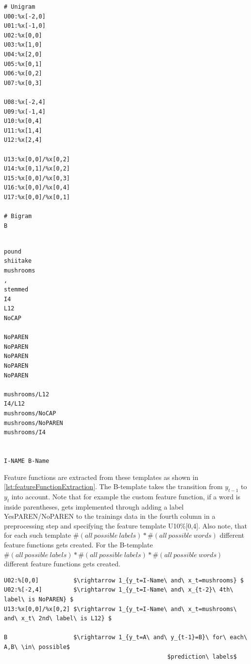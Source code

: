\documentclass[12pt, twoside]{report}
\begin{document}
\newpage
\begin{minipage}{0.4\textwidth} 
\begin{lstlisting}[frame=single, caption={Feature templates for New York Times CRF}, label=lst:NYTfeatureTemplates]
# Unigram               
U00:%x[-2,0]             
U01:%x[-1,0]              
U02:%x[0,0]
U03:%x[1,0]
U04:%x[2,0]
U05:%x[0,1]
U06:%x[0,2]
U07:%x[0,3]

U08:%x[-2,4]
U09:%x[-1,4]
U10:%x[0,4]
U11:%x[1,4]
U12:%x[2,4]

U13:%x[0,0]/%x[0,2]
U14:%x[0,1]/%x[0,2]
U15:%x[0,0]/%x[0,3]
U16:%x[0,0]/%x[0,4]
U17:%x[0,0]/%x[0,1]

# Bigram
B
\end{lstlisting}
\end{minipage}
\hfill
\begin{minipage}{0.5\textwidth} 
\begin{lstlisting}[frame=single, caption={Derived value when the current word in \cref{lst:NYTTrainingData} is mushrooms}, label=lst:NYTfeatureTemplatesDerivedValue]
            
pound            
shiitake            
mushrooms
,
stemmed
I4
L12
NoCAP

NoPAREN
NoPAREN
NoPAREN
NoPAREN
NoPAREN

mushrooms/L12
I4/L12
mushrooms/NoCAP
mushrooms/NoPAREN
mushrooms/I4


I-NAME B-Name
\end{lstlisting}
\end{minipage}

Feature functions are extracted from these templates as shown in \cref{lst:featureFunctionExtraction}. The B-template takes the transition from $y_{t-1}$ to $y_t$ into account. Note that for example the custom feature function, if a word is inside parentheses, gets implemented through adding a label YesPAREN/NoPAREN to the trainings data in the fourth column in a preprocessing step and specifying the feature template U10\%[0,4]. Also note, that for each such template $\#(all\ possible\ labels)*\#(all\ possible\ words)$ different feature functions gets created. For the B-template $\#(all\ possible\ labels)*\#(all\ possible\ labels)*\#(all\ possible\ words)$ different feature functions gets created.

\begin{lstlisting}[frame=single, caption={Extracting of feature functions from templates}, label=lst:featureFunctionExtraction, mathescape]
U02:%[0,0]          $\rightarrow 1_{y_t=I-Name\ and\ x_t=mushrooms} $
U02:%[-2,4]         $\rightarrow 1_{y_t=I-Name\ and\ x_{t-2}\ 4th\ label\ is NoPAREN} $
U13:%x[0,0]/%x[0,2] $\rightarrow 1_{y_t=I-Name\ and\ x_t=mushrooms\ and\ x_t\ 2nd\ label\ is L12} $

B                   $\rightarrow 1_{y_t=A\ and\ y_{t-1}=B}\ for\ each\ A,B\ \in\ possible$
                                               $prediction\ labels$
\end{lstlisting}
\end{document}
